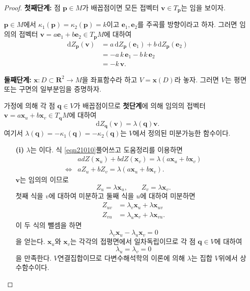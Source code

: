 \begin{proof}
\textbf{첫째단계:} 점 $\mathbf{p} \in M$가 배꼽점이면 모든 접벡터
$\mathbf{v}\in T_{\mathbf{p}}$는 임을 보이자.

$\mathbf{p}\in M$에서
$\kappa_1(\mathbf{p}) = \kappa_2(\mathbf{p}) = k$이고 $\mathbf{e}_1, \mathbf{e}_2$를
주곡률 방향이라고 하자. 그러면 임의의 접벡터 $\mathbf{v} = a \mathbf{e}_1 +
b \mathbf{e}_2 \in T_{\mathbf{p}} M$에 대하여
\begin{align}
\mathrm{d}Z_{\mathbf{p}}(\mathbf{v})
&= a\, \mathrm{d}Z_{\mathbf{p}}(\mathbf{e}_1) +
b \,\mathrm{d}Z_{\mathbf{p}}(\mathbf{e}_2)\\
&= -a \,k\,  \mathbf{e}_1 - b\, k\,\mathbf{e}_2\\
&= -k \,\mathbf{v}.
\end{align}

\textbf{둘째단계:} $\mathbf{x}: D \subset \mathbf{R}^2 \to M$을 좌표함수라 하고 $V = \mathbf{x}(D)$라
놓자. 그러면 $V$는 평면 또는 구면의 일부분임을 증명하자.

가정에 의해 각 점 $\mathbf{q}\in V$가 배꼽점이므로 \textbf{첫단계}에 의해
임의의 접벡터 $\mathbf{v} = a \mathbf{x}_u + b \mathbf{x}_v \in
T_{\mathbf{q}} M$에 대하여
\begin{equation}
\mathrm{d}Z_{\mathbf{q}}(\mathbf{v}) = \lambda(\mathbf{q}) \mathbf{v}.
\label{eqn21010}
\end{equation}
여기서 $\lambda(\mathbf{q}) = - \kappa_1(\mathbf{q}) = -\kappa_2(\mathbf{q})$는 $V$에서
정의된 미분가능한 함수이다.

\begin{itemize}
\item[\textbf{(i)}] $\lambda$는 이다.
식 \eqref{eqn21010}\를 풀어쓰고 도움정리를 이용하면
\begin{align}
&a dZ(\mathbf{x}_u) + b dZ(\mathbf{x}_v) = \lambda (a \mathbf{x}_u + b \mathbf{x}_v)\\
\Leftrightarrow{}& a Z_u + b Z_v = \lambda (a \mathbf{x}_u + b \mathbf{x}_v).
\end{align}
$\mathbf{v}$는 임의의 이므로
\[
Z_u = \lambda \mathbf{x}_u, \qquad Z_v = \lambda \mathbf{x}_v.
\]
첫째 식을 $v$에 대하여 미분하고 둘째 식을 $u$에 대하여 미분하면
\begin{align}
Z_{uv} &= \lambda_v \mathbf{x}_u + \lambda  \mathbf{x}_{uv}\\
Z_{v u} &= \lambda_u \mathbf{x}_v + \lambda  \mathbf{x}_{vu}.
\end{align}
이 두 식의 뺄셈을 하면
\[
\lambda_v \mathbf{x}_u - \lambda_u  \mathbf{x}_v =0
\]
을 얻는다. $\mathbf{x}_u$와 $\mathbf{x}_v$는 각각의 접평면에서
일차독립이므로 각 점 $\mathbf{q}\in V$에 대하여
\[
\lambda_u = \lambda_v = 0
\]
을 만족한다. $V$연결집합이므로 다변수해석학의 이론에 의해
$\lambda$는 집합 $V$위에서 상수함수이다.


\end{itemize}
\end{proof}
